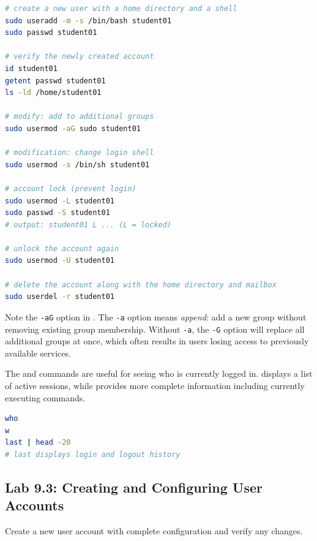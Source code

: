 \begin{lstlisting}[language=bash, caption={User account lifecycle}]
# create a new user with a home directory and a shell
sudo useradd -m -s /bin/bash student01
sudo passwd student01

# verify the newly created account
id student01
getent passwd student01
ls -ld /home/student01

# modify: add to additional groups
sudo usermod -aG sudo student01

# modification: change login shell
sudo usermod -s /bin/sh student01

# account lock (prevent login)
sudo usermod -L student01
sudo passwd -S student01
# output: student01 L ... (L = locked)

# unlock the account again
sudo usermod -U student01

# delete the account along with the home directory and mailbox
sudo userdel -r student01
\end{lstlisting}

Note the \texttt{-aG} option in . The \texttt{-a} option means \textit{append}: add a new group without removing existing group membership. Without \texttt{-a}, the \texttt{-G} option will replace all additional groups at once, which often results in users losing access to previously available services.

The  and  commands are useful for seeing who is currently logged in.  displays a list of active sessions, while  provides more complete information including currently executing commands.

\begin{lstlisting}[language=bash, caption={Check active user sessions}]
who
w
last | head -20
# last displays login and logout history
\end{lstlisting}

\subsection*{Lab 9.3: Creating and Configuring User Accounts}

Create a new user account with complete configuration and verify any changes.

